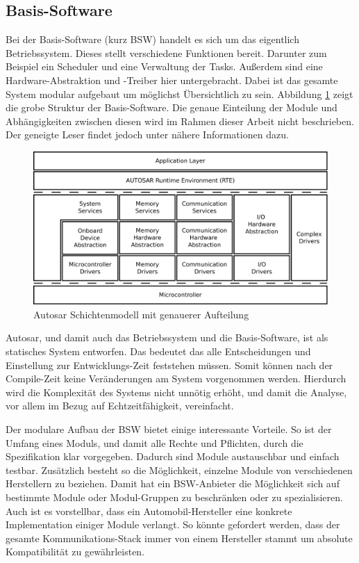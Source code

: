 \documentclass[
  a4paper,					    %
  twoside,
  DIV=calc,     				%
  bibliography=totoc,
  cleardoublepage=empty,
  ngerman,     					%
  final       					%
]{scrbook}
\begin{document}
\subsection{Basis-Software}
\label{sec:bsw}
Bei der Basis-Software (kurz BSW) handelt es sich um das eigentlich Betriebssystem. Dieses stellt verschiedene Funktionen bereit. Darunter zum Beispiel ein Scheduler und eine Verwaltung der Tasks. Außerdem sind eine Hardware-Abstraktion und -Treiber hier untergebracht. Dabei ist das gesamte System modular aufgebaut um möglichst Übersichtlich zu sein. Abbildung \ref{fig:autosar_refined_layer} zeigt die grobe Struktur der Basis-Software. Die genaue Einteilung der Module und Abhängigkeiten zwischen diesen wird im Rahmen dieser Arbeit nicht beschrieben. Der geneigte Leser findet jedoch unter \cite{autosar_layer} nähere Informationen dazu.

\begin{figure}[h]
    \centering
    \includegraphics[width=1\textwidth]{autosar_refined_layer}
    \caption{Autosar Schichtenmodell mit genauerer Aufteilung}
    \label{fig:autosar_refined_layer}
\end{figure}

Autosar, und damit auch das Betriebssystem und die Basis-Software, ist als statisches System entworfen. Das bedeutet das alle Entscheidungen und Einstellung zur Entwicklungs-Zeit feststehen müssen. Somit können nach der Compile-Zeit keine Veränderungen am System vorgenommen werden. Hierdurch wird die Komplexität des Systems nicht unnötig erhöht, und damit die Analyse, vor allem im Bezug auf Echtzeitfähigkeit, vereinfacht.

Der modulare Aufbau der BSW bietet einige interessante Vorteile. So ist der Umfang eines Moduls, und damit alle Rechte und Pflichten, durch die Spezifikation klar vorgegeben. Dadurch sind Module austauschbar und einfach testbar. Zusätzlich besteht so die Möglichkeit, einzelne Module von verschiedenen Herstellern zu beziehen. Damit hat ein BSW-Anbieter die Möglichkeit sich auf bestimmte Module oder Modul-Gruppen zu beschränken oder zu spezialisieren. Auch ist es vorstellbar, dass ein Automobil-Hersteller eine konkrete Implementation einiger Module verlangt. So könnte gefordert werden, dass der gesamte Kommunikations-Stack immer von einem Hersteller stammt um absolute Kompatibilität zu gewährleisten.
\end{document}
